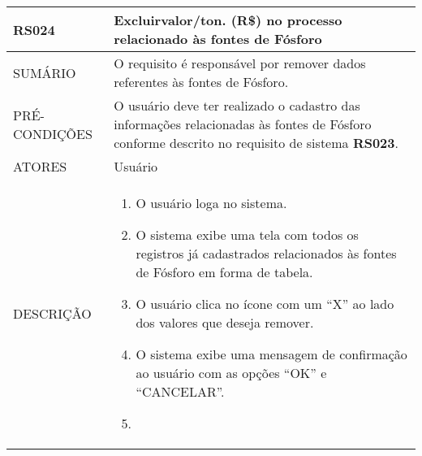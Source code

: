 \begin{longtable}[c]{@{}|p{4cm}|p{9cm}|@{}}
\hline
\begin{minipage}[t]{0.47\columnwidth}
\textbf{RS024}
\end{minipage} & \begin{minipage}[t]{0.47\columnwidth}
Excluirvalor/ton. (R\$) no processo relacionado às fontes de Fósforo
\end{minipage}
\\\hline
\begin{minipage}[t]{0.47\columnwidth}
SUMÁRIO
\end{minipage} & \begin{minipage}[t]{0.47\columnwidth}
O requisito é responsável por remover dados referentes às fontes de
Fósforo.
\end{minipage}
\\\hline
\begin{minipage}[t]{0.47\columnwidth}
PRÉ-CONDIÇÕES
\end{minipage} & \begin{minipage}[t]{0.47\columnwidth}
O usuário deve ter realizado o cadastro das informações
relacionadas às fontes de Fósforo conforme descrito no requisito
de sistema \textbf{RS023}.
\end{minipage}
\\\hline
\begin{minipage}[t]{0.47\columnwidth}
ATORES
\end{minipage} & \begin{minipage}[t]{0.47\columnwidth}
Usuário
\end{minipage}
\\\hline
\begin{minipage}[t]{0.47\columnwidth}
DESCRIÇÃO
\end{minipage} & \begin{minipage}[t]{0.47\columnwidth}
\begin{enumerate}
\def\labelenumi{\arabic{enumi}.}
\itemsep1pt\parskip0pt\parsep0pt
\item
  O usuário loga no sistema.
\item
  O sistema exibe uma tela com todos os registros já cadastrados
  relacionados às fontes de Fósforo em forma de tabela.
\item
  O usuário clica no ícone com um ``X'' ao lado dos valores que deseja
  remover. 
\item
  O sistema exibe uma mensagem de confirmação ao usuário com as opções
  ``OK'' e ``CANCELAR''.
\item

\end{enumerate}
\end{minipage}
\end{longtable}
